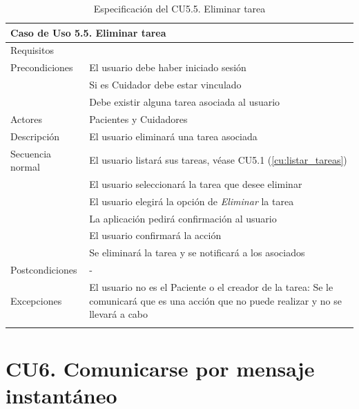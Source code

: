 \begin{longtable}{|p{} p{}|}
    \hline
    \multicolumn{2}{|l|}{\textbf{Caso de Uso 5.5. Eliminar tarea}} \\ \hline \hline
    Requisitos          & {req:eliminar_tarea} \\ \hline
    Precondiciones      & El usuario debe haber iniciado sesión \\
                        & Si es Cuidador debe estar vinculado \\ 
                        & Debe existir alguna tarea asociada al usuario \\ \hline
    Actores             & Pacientes y Cuidadores \\ \hline
    Descripción         & El usuario eliminará una tarea asociada \\ \hline
    Secuencia normal    & El usuario listará sus tareas, véase CU5.1 (\ref{cu:listar_tareas}) \\
                        & El usuario seleccionará la tarea que desee eliminar \\
                        & El usuario elegirá la opción de \emph{Eliminar} la tarea \\
                        & La aplicación pedirá confirmación al usuario \\
                        & El usuario confirmará la acción \\
                        & Se eliminará la tarea y se notificará a los asociados \\ \hline
    Postcondiciones     & - \\ \hline
    Excepciones         & El usuario no es el Paciente o el creador de la tarea: Se le comunicará que es una acción que no puede realizar y no se llevará a cabo \\ \hline
    \caption{Especificación del CU5.5. Eliminar tarea}
    \label{cu:eliminar_tarea}
\end{longtable}

\section{CU6. Comunicarse por mensaje instantáneo}
\label{sec:cu:mensajes}

